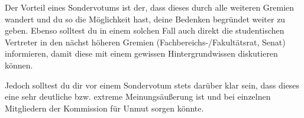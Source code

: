 Der Vorteil eines Sondervotums ist der, dass dieses durch alle weiteren Gremien wandert und du so die Möglichkeit hast, deine Bedenken begründet weiter zu geben. Ebenso solltest du in einem solchen Fall auch direkt die studentischen Vertreter in den nächst höheren Gremien (Fachbereichs-/Fakultätsrat, Senat) informieren, damit diese mit einem gewissen Hintergrundwissen diskutieren können.

Jedoch solltest du dir vor einem Sondervotum stets darüber klar sein, dass dieses eine sehr deutliche bzw. extreme Meinungsäußerung ist und bei einzelnen Mitgliedern der Kommission für Unmut sorgen könnte.

